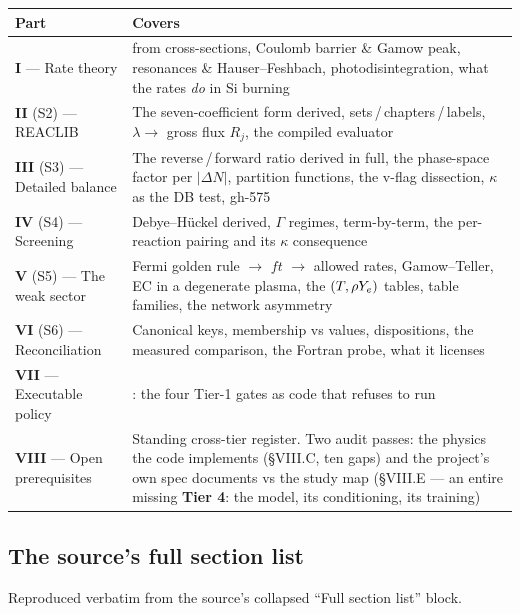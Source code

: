 \begin{center}
\begin{tabularx}{\textwidth}{@{}L{3.0cm} Y@{}}
\toprule
\textbf{Part} & \textbf{Covers} \\
\midrule
\textbf{I} --- Rate theory &
  \sigv{} from cross-sections, Coulomb barrier \& Gamow peak, resonances \&
  Hauser--Feshbach, photodisintegration, what the rates \emph{do} in Si
  burning \\
\textbf{II} (S2) --- REACLIB &
  The seven-coefficient form derived, sets\,/\,chapters\,/\,labels,
  $\lambda \to$ gross flux $R_j$, the compiled evaluator \\
\textbf{III} (S3) --- Detailed balance &
  The reverse\,/\,forward ratio derived in full, the phase-space factor per
  $|\Delta N|$, partition functions, the v-flag dissection, $\kappa$ as the DB
  test, gh-575 \\
\textbf{IV} (S4) --- Screening &
  Debye--H\"uckel derived, $\Gamma$ regimes, 
  term-by-term, the per-reaction pairing and its $\kappa$ consequence \\
\textbf{V} (S5) --- The weak sector &
  Fermi golden rule $\to$ $ft$ $\to$ allowed rates, Gamow--Teller, EC in a
  degenerate plasma, the $(T, \rho Y_{e})$ tables, table families, the network
  asymmetry \\
\textbf{VI} (S6) --- Reconciliation &
  Canonical keys, membership vs values, dispositions, the measured comparison,
  the Fortran probe, what it licenses \\
\textbf{VII} --- Executable policy &
  : the four Tier-1 gates as code that refuses to run \\
\textbf{VIII} --- Open prerequisites &
  Standing cross-tier register. Two audit passes: the physics the code
  implements (\S VIII.C, ten gaps) and the project's own spec documents vs the
  study map (\S VIII.E --- an entire missing \textbf{Tier 4}: the model, its
  conditioning, its training) \\
\bottomrule
\end{tabularx}
\end{center}

\subsection{The source's full section list}

Reproduced verbatim from the source's collapsed ``Full section list'' block.

